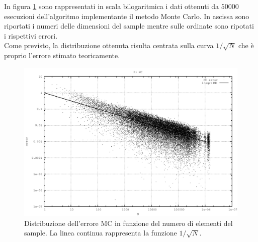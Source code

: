 In figura \ref{fig:pi} sono rappresentati in scala bilogaritmica i dati ottenuti da $50000$ esecuzioni dell'algoritmo implementante il metodo Monte Carlo. In ascissa sono riportati i numeri delle dimensioni del sample mentre sulle ordinate sono ripotati i rispettivi errori.\\
Come previsto, la distribuzione ottenuta risulta centrata sulla curva $1/\sqrt{N}$ che è proprio l'errore stimato teoricamente.
\begin{figure}[H]
\centering
\includegraphics[width=\textwidth]{pi}
\caption{Distribuzione dell'errore MC in funzione del numero di elementi del sample. La linea continua rappresenta la funzione $1/\sqrt{N}$.}
\label{fig:pi}
\end{figure}


